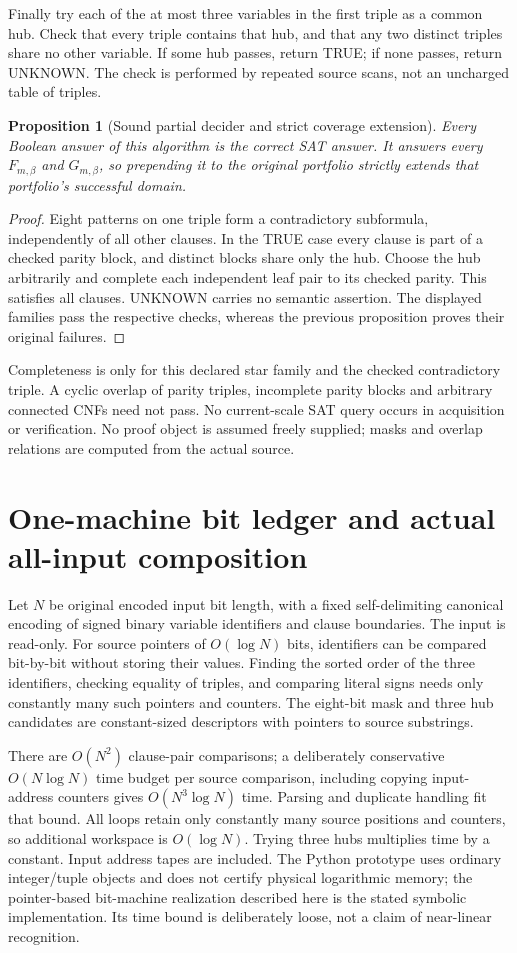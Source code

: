 \documentclass[11pt]{article}
\newtheorem{proposition}{Proposition}
\begin{document}
Finally try each of the at most three variables in the first triple as a common hub. Check that every triple contains that hub, and that any two distinct triples share no other variable. If some hub passes, return TRUE; if none passes, return UNKNOWN. The check is performed by repeated source scans, not an uncharged table of triples.

\begin{proposition}[Sound partial decider and strict coverage extension]
Every Boolean answer of this algorithm is the correct SAT answer. It answers every $F_{m,\beta}$ and $G_{m,\beta}$, so prepending it to the original portfolio strictly extends that portfolio's successful domain.
\end{proposition}
\begin{proof}
Eight patterns on one triple form a contradictory subformula, independently of all other clauses. In the TRUE case every clause is part of a checked parity block, and distinct blocks share only the hub. Choose the hub arbitrarily and complete each independent leaf pair to its checked parity. This satisfies all clauses. UNKNOWN carries no semantic assertion. The displayed families pass the respective checks, whereas the previous proposition proves their original failures.
\end{proof}
Completeness is only for this declared star family and the checked contradictory triple. A cyclic overlap of parity triples, incomplete parity blocks and arbitrary connected CNFs need not pass. No current-scale SAT query occurs in acquisition or verification. No proof object is assumed freely supplied; masks and overlap relations are computed from the actual source.

\section{One-machine bit ledger and actual all-input composition}
Let $N$ be original encoded input bit length, with a fixed self-delimiting canonical encoding of signed binary variable identifiers and clause boundaries. The input is read-only. For source pointers of $O(\log N)$ bits, identifiers can be compared bit-by-bit without storing their values. Finding the sorted order of the three identifiers, checking equality of triples, and comparing literal signs needs only constantly many such pointers and counters. The eight-bit mask and three hub candidates are constant-sized descriptors with pointers to source substrings.

There are $O(N^2)$ clause-pair comparisons; a deliberately conservative $O(N\log N)$ time budget per source comparison, including copying input-address counters gives $O(N^3\log N)$ time. Parsing and duplicate handling fit that bound. All loops retain only constantly many source positions and counters, so additional workspace is $O(\log N)$. Trying three hubs multiplies time by a constant. Input address tapes are included. The Python prototype uses ordinary integer/tuple objects and does not certify physical logarithmic memory; the pointer-based bit-machine realization described here is the stated symbolic implementation. Its time bound is deliberately loose, not a claim of near-linear recognition.
\end{document}
